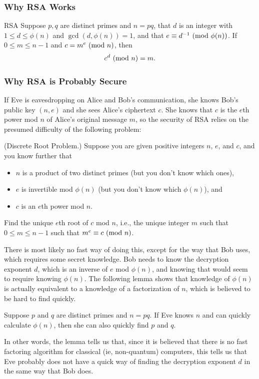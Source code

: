 \documentclass[letterpaper]{article}
\begin{document}
\subsubsection{Why RSA Works}
\begin{theorem}{RSA}{}
    Suppose $p, q$ are distinct primes and $n = pq$, that $d$ is an integer with $1 \leq d \leq \phi(n)$ and $\gcd(d, \phi(n)) = 1$, and that $e \equiv d^{-1} \ (\mathrm{mod}\ \phi(n))$. If $0 \leq m \leq n - 1$ and $c = m^e \ (\mathrm{mod}\ n)$, then \[c^d \ (\mathrm{mod}\ n) = m.\]
\end{theorem}


\subsubsection{Why RSA is Probably Secure}
If Eve is eavesdropping on Alice and Bob's communication, she knows Bob's public key $(n, e)$ and she sees Alice's ciphertext $c$. She knows that $c$ is the $e$th power mod $n$ of Alice's original message $m$, so the security of RSA relies on the presumed difficulty of the following problem: 
\begin{mdframed}
    (Discrete Root Problem.) Suppose you are given positive integers $n$, $e$, and $c$, and you know further that 
    \begin{itemize}
        \item $n$ is a product of two distinct primes (but you don't know which ones),
        \item $e$ is invertible mod $\phi(n)$ (but you don't know which $\phi(n)$), and 
        \item $c$ is an $e$th power mod $n$.
    \end{itemize}
    Find the unique $e$th root of $c$ mod $n$, i.e., the unique integer $m$ such that $0 \leq m \leq n - 1$ such that $m^e \equiv c \ (\mathrm{mod}\ n)$. 
\end{mdframed}
There is most likely no fast way of doing this, except for the way that Bob uses, which requires some secret knowledge. Bob needs to know the decryption exponent $d$, which is an inverse of $e$ mod $\phi(n)$, and knowing that would seem to require knowing $\phi(n)$. The following lemma shows that knowledge of $\phi(n)$ is actually equivalent to a knowledge of a factorization of $n$, which is believed to be hard to find quickly. 

\begin{lemma}{}{}
    Suppose $p$ and $q$ are distinct primes and $n = pq$. If Eve knows $n$ and can quickly calculate $\phi(n)$, then she can also quickly find $p$ and $q$. 
\end{lemma}
In other words, the lemma tells us that, since it is believed that there is no fast factoring algorithm for classical (ie, non-quantum) computers, this tells us that Eve probably does not have a quick way of finding the decryption exponent $d$ in the same way that Bob does. 
\end{document}
